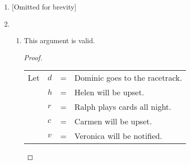 \documentclass[11pt, notitlepage, leqno]{article}
\renewcommand{\neg}{\mathord{\sim}}
\begin{document}
\begin{enumerate}
\begin{enumerate}
\item \textit{Proof.} \nopagebreak \vspace{-10pt}
\begin{align} \setcounter{equation}{0}
	& (\neg p \vee q) \to r && \textrm{Premise}\\
 	& r \to (s \vee t) 	&& \textrm{Premise}\\
 	& \neg s \wedge \neg u && \textrm{Premise}\\
 	& \neg u \to \neg t && \textrm{Premise}\\
 	& \neg s 			&& \textrm{[SPEC] on 3}\\
 	& r \to t 			&& \textrm{[ELIM] on 2, 5}\\
 	& \neg u 			&& \textrm{[SPEC] on 3}\\
 	& \neg t 			&& \textrm{[M.\ PON] on 4, 7}\\
 	& \neg (p \wedge q) \to r && \textrm{[DM] on 1}\\
 	& \neg (p \wedge q) \to t && \textrm{[TRANS] on 9, 6}\\
 	& p \wedge q 		&& \textrm{[M.\ TOL] on 10, 8}\\
 	& \notag\overline{\therefore p} 		&& \textrm{[SPEC] on 11} & \blacksquare
\end{align}

\end{enumerate}

\item {[Omitted for brevity]} \newpage

\item \begin{enumerate}

\item This argument is valid.
\begin{proof}
\begin{tabular}[t]{llll}
Let & $d$ & = & Dominic goes to the racetrack. \\
& $h$ & = & Helen will be upset.           \\
& $r$ & = & Ralph plays cards all night.   \\
& $c$ & = & Carmen will be upset.          \\
& $v$ & = & Veronica will be notified.\\
\end{tabular}


\end{proof}
\end{enumerate}
\end{enumerate}
\end{document}
